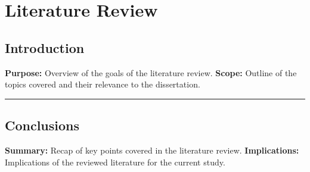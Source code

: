 \section{Literature Review}\label{section:Literature_Review}
\subsection{Introduction}
\textbf{Purpose:} Overview of the goals of the literature review.\newline
\textbf{Scope:} Outline of the topics covered and their relevance to the dissertation.\newline
\noindent\rule{\textwidth}{0.1pt}

\newpage



\newpage



\subsection{Conclusions}
\textbf{Summary:} Recap of key points covered in the literature review.\newline
\textbf{Implications:} Implications of the reviewed literature for the current study.\newline